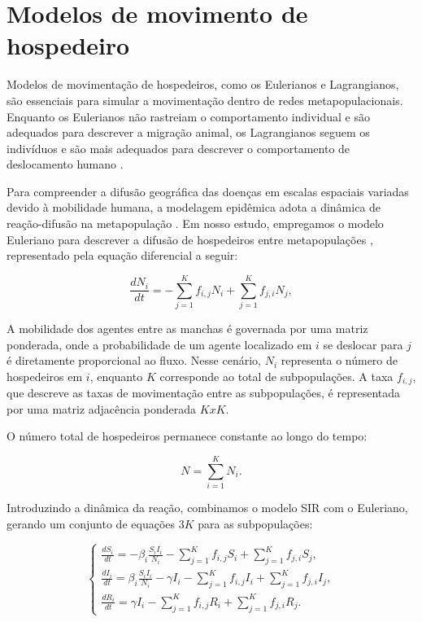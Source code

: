 \newpage

\section{Modelos de movimento de hospedeiro}

Modelos de movimentação de hospedeiros, como os Eulerianos e Lagrangianos, são essenciais para simular a movimentação dentro de redes metapopulacionais. Enquanto os Eulerianos não rastreiam o comportamento individual e são adequados para descrever a migração animal, os Lagrangianos seguem os indivíduos e são mais adequados para descrever o comportamento de deslocamento humano \cite{Citron2021}.

Para compreender a difusão geográfica das doenças em escalas espaciais variadas devido à mobilidade humana, a modelagem epidêmica adota a dinâmica de reação-difusão na metapopulação \cite{Dirk2013}. Em nosso estudo, empregamos o modelo Euleriano para descrever a difusão de hospedeiros entre metapopulações \cite{Citron2021}, representado pela equação diferencial a seguir:
{\large
\begin{center}
\begin{equation}
    \frac{dN_{i}}{dt} = -\sum_{j=1}^{K} f_{i, j} N_{i} + \sum_{j=1}^{K} f_{j, i} N_{j},
\end{equation}
\end{center}}

A mobilidade dos agentes entre as manchas é governada por uma matriz ponderada, onde a probabilidade de um agente localizado em $i$ se deslocar para $j$ é diretamente proporcional ao fluxo. Nesse cenário, $N_{i}$ representa o número de hospedeiros em $i$, enquanto $K$ corresponde ao total de subpopulações. A taxa $f_{i, j}$, que descreve as taxas de movimentação entre as subpopulações, é representada por uma matriz adjacência ponderada $KxK$. 

O número total de hospedeiros permanece constante ao longo do tempo:
{\large
\begin{center}
\begin{equation}
    N = \sum_{i=1}^{K} N_{i}.
\end{equation}
\end{center}}

Introduzindo a dinâmica da reação, combinamos o modelo SIR com o Euleriano, gerando um conjunto de equações $3K$ para as subpopulações:

{\large
\begin{equation}
\begin{cases}
    \frac{dS_{i}}{dt} = -\beta_{i} \frac{S_{i}I_{i}}{N_{i}} -\sum_{j=1}^{K} f_{ i, j} S_{i} + \sum_{j=1}^{K} f_{j, i} S_{j}, \\
    \frac{dI_{i}}{dt} = \beta_{i} \frac{S_{i}I_{i}}{N_{i}} - \gamma I_{i} -\sum_{j=1} ^{K} f_{i, j} I_{i} + \sum_{j=1}^{K} f_{j, i} I_{j}, \\
    \frac{dR_{i}}{dt} = \gamma I_{i} -\sum_{j=1}^{K} f_{i, j} R_{i} + \sum_{j=1}^{ K} f_{j, i} R_{j}.
\end{cases}
\end{equation}}

